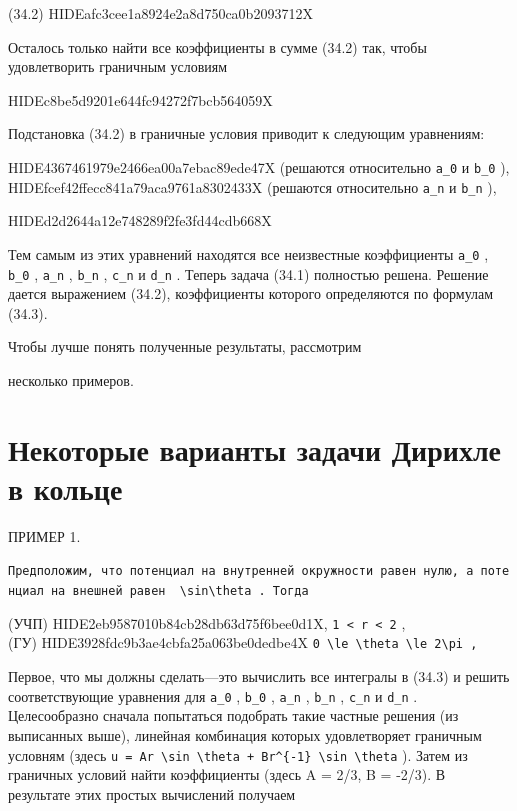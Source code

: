 \documentclass[
  ukrainian,
]{article}
\begin{document}
(34.2) HIDEafc3cee1a8924e2a8d750ca0b2093712X

Осталось только найти все коэффициенты в сумме (34.2) так, чтобы
удовлетворить граничным условиям

HIDEc8be5d9201e644fc94272f7bcb564059X

Подстановка (34.2) в граничные условия приводит к следующим уравнениям:

HIDE4367461979e2466ea00a7ebac89ede47X (решаются относительно
\texttt{a\_0} и \texttt{b\_0} ), HIDEfcef42ffecc841a79aca9761a8302433X
(решаются относительно \texttt{a\_n} и \texttt{b\_n} ),

HIDEd2d2644a12e748289f2fe3fd44cdb668X

Тем самым из этих уравнений находятся все неизвестные коэффициенты
\texttt{a\_0} , \texttt{b\_0} , \texttt{a\_n} , \texttt{b\_n} ,
\texttt{c\_n} и \texttt{d\_n} . Теперь задача (34.1) полностью решена.
Решение дается выражением (34.2), коэффициенты которого определяются по
формулам (34.3).

Чтобы лучше понять полученные результаты, рассмотрим

несколько примеров.

\section{Некоторые варианты задачи Дирихле в
кольце}\label{ux43dux435ux43aux43eux442ux43eux440ux44bux435-ux432ux430ux440ux438ux430ux43dux442ux44b-ux437ux430ux434ux430ux447ux438-ux434ux438ux440ux438ux445ux43bux435-ux432-ux43aux43eux43bux44cux446ux435}

ПРИМЕР 1.

\texttt{Предположим,\ что\ потенциал\ на\ внутренней\ окружности\ равен\ нулю,\ а\ потенциал\ на\ внешней\ равен\ \ \textquotesingle{}\textbackslash{}sin\textbackslash{}theta\textquotesingle{}\ .\ Тогда}

(УЧП) HIDE2eb9587010b84cb28db63d75f6bee0d1X,
\texttt{1\ \textless{}\ r\ \textless{}\ 2} ,\\
(ГУ) HIDE3928fdc9b3ae4cbfa25a063be0dedbe4X
\texttt{\textquotesingle{}0\ \textbackslash{}le\ \textbackslash{}theta\ \textbackslash{}le\ 2\textbackslash{}pi\textquotesingle{}\ ,}

Первое, что мы должны сделать---это вычислить все интегралы в (34.3) и
решить соответствующие уравнения для \texttt{a\_0} , \texttt{b\_0} ,
\texttt{a\_n} , \texttt{b\_n} , \texttt{c\_n} и \texttt{d\_n} .
Целесообразно сначала попытаться подобрать такие частные решения (из
выписанных выше), линейная комбинация которых удовлетворяет граничным
условням (здесь
\texttt{u\ =\ Ar\ \textbackslash{}sin\ \textbackslash{}theta\ +\ Br\^{}\{-1\}\ \textbackslash{}sin\ \textbackslash{}theta}
). Затем из граничных условий найти коэффициенты (здесь A = 2/3, B =
-2/3). В результате этих простых вычислений получаем
\end{document}
